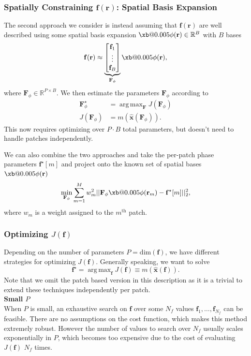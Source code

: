 \documentclass{article}
\makeatletter
\newcommand{\xbold}[2][0.005]{\mathpalette{\xb@{#1}}{#2}}
\newcommand{\xb@}[3]{%
  \sbox\z@{$\m@th#2\bm{#3}$}%
  \dimen@=#1\wd\z@
  \hbox{%
    \rlap{\kern-\dimen@\copy\z@}%
    \rlap{\kern\dimen@\copy\z@}%
    \rlap{\raise\dimen@\copy\z@}%
    \rlap{\lower\dimen@\copy\z@}%
    \copy\z@\kern\dimen@}%
}
\newcommand{\PHI}{\xbold{\phi}}
\DeclareMathOperator*{\argmax}{arg\,max}
\newcommand{\x}{\mathbf{x}}
\renewcommand{\r}{\mathbf{r}}
\newcommand{\f}{\mathbf{f}}
\newcommand{\F}{\mathbf{F}}
\makeatother
\begin{document}
\subsubsection{Spatially Constraining $\f(\r)$: Spatial Basis Expansion}
The second approach we consider is instead assuming that $\f(\r)$ are well described using some spatial basis expansion $\PHI(\r) \in \mathbb{R}^B$ with $B$ bases 
\begin{equation}
    \f(\r) \approx \underbrace{\begin{bmatrix} \f_1 \\ \vdots \\ \f_B \end{bmatrix}}_{\F_\phi} \PHI(\r),
\end{equation}
where $\F_\phi \in \mathbb{R}^{P \times B}$. We then estimate the parameters $\F_\phi$ according to 
\begin{align}
    \F_\phi^\star &= \argmax_\F J(\F_\phi) \\ 
    J(\F_\phi) &= m(\hat{\x}(\F_\phi)).
\end{align}
This now requires optimizing over $P \cdot B$ total parameters, but doesn't need to handle patches independently. 

We can also combine the two approaches and take the per-patch phase parameters $\f^\star[m]$ and project onto the known set of spatial bases $\PHI(\r)$
\begin{equation}
    \min_{\F_\phi} \sum_{m=1}^M w_m^2|| \F_\phi \PHI(\r_m) - \f^\star[m] ||_2^2,
\end{equation}
where $w_m$ is a weight assigned to the $m^\text{th}$ patch.

\subsubsection{Optimizing $J(\f)$}
Depending on the number of parameters $P = \text{dim}(\f)$, we have different strategies for optimizing $J(\f)$. Generally speaking, we want to solve
\begin{equation}
    \f^\star = \argmax_{\f} J(\f) \equiv m(\hat{\x}(\f)).
\end{equation}
Note that we omit the patch based version in this description as it is a trivial to extend these techniques independently per patch.\\

\noindent \textbf{Small $P$} \\
When $P$ is small, an exhaustive search on $\f$ over some $N_f$ values $\f_1, \dots, \f_{N_f}$ can be feasible. There are no assumptions on the cost function, which makes this method extremely robust. However the number of values to search over $N_f$ usually scales exponentially in $P$, which becomes too expensive due to the cost of evaluating $J(\f)$ $N_f$ times.\\
\end{document}
